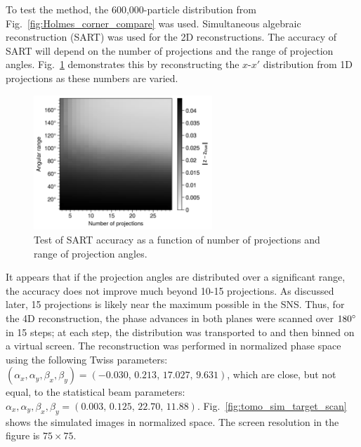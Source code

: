 To test the method, the 600,000-particle distribution from Fig.~\ref{fig:Holmes_corner_compare} was used. Simultaneous algebraic reconstruction (SART) was used for the 2D reconstructions. The accuracy of SART will depend on the number of projections and the range of projection angles. Fig.~\ref{fig:tomo_sim_art2D} demonstrates this by reconstructing the $x$-$x'$ distribution from 1D projections as these numbers are varied.
%
\begin{figure}[!p]
    \centering
    \vspace*{3.0cm}
    \includegraphics[width=0.6\textwidth]{Images/chapter4/tomo_sim_art2d.png}
    \caption{Test of SART accuracy as a function of number of projections and range of projection angles.}
    \label{fig:tomo_sim_art2D}
    \vspace*{3.0cm}
\end{figure}
%
It appears that if the projection angles are distributed over a significant range, the accuracy does not improve much beyond 10-15 projections. As discussed later, 15 projections is likely near the maximum possible in the SNS. Thus, for the 4D reconstruction, the phase advances in both planes were scanned over $180\degree$ in 15 steps; at each step, the distribution was transported to and then binned on a virtual screen. The reconstruction was performed in normalized phase space using the following Twiss parameters: $(\alpha_x, \alpha_y, \beta_x, \beta_y) = (
-0.030,\, 0.213,\, 17.027,\, 9.631)$, which are close, but not equal, to the statistical beam parameters: $\alpha_x, \alpha_y, \beta_x, \beta_y = (0.003,\, 0.125,\, 22.70,\, 11.88)$. Fig.~\ref{fig:tomo_sim_target_scan} shows the simulated images in normalized space. The screen resolution in the figure is $75 \times 75$.
%
